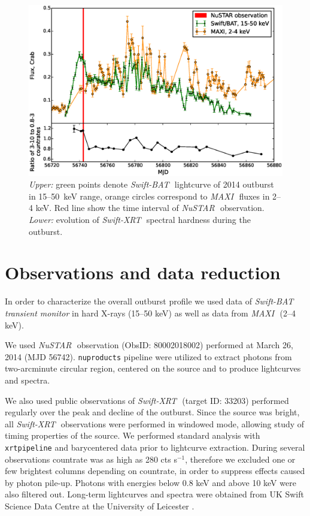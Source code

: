 \documentclass[a4paper,fleqn,usenatbib]{mnras}
\def\swiftx{{\em Swift-XRT\,}}
\def\swiftb{{\em Swift-BAT\,}}
\def\nustar{{\em NuSTAR\,}}
\def\maxi{{\em MAXI\,}}
\begin{document}
\begin{figure}
\centerline{\includegraphics[scale=0.5]{batlc_v06.eps}}
\caption{{\it Upper:} green points denote \swiftb\, lightcurve of 2014 outburst in 15--50~keV range, orange circles correspond to \maxi\, fluxes in 2--4 keV. 
Red line show the time interval of \nustar\, observation. 
{\it Lower:} evolution of \swiftx\, spectral hardness during the outburst.} 
\label{fig:batlc}
\end{figure} 

\section{Observations and data reduction}
\label{sec:datared} 
In order to characterize the overall outburst profile we used data of \swiftb\, {\it transient monitor} \citep{krimm13bat} in hard X-rays (15--50 keV) as well as data from \maxi\, \citep{matsuoka13maxi} (2--4 keV).

We used \nustar\, observation (ObsID: 80002018002) performed at March 26, 2014 (MJD 56742). 
{\texttt{nuproducts}} pipeline were utilized to extract photons from two-arcminute circular region, centered on the source and to produce lightcurves and spectra.

We also used public observations of \swiftx\, (target ID: 33203) performed regularly over the peak and decline of the outburst.  
Since the source was bright, all \swiftx\, observations were performed in windowed mode, allowing study of timing properties of the source. 
We performed standard analysis with {\texttt{xrtpipeline}} and barycentered data prior to lightcurve extraction. 
During several observations countrate was as high as 280 cts s$^{-1}$, therefore we excluded one or few brightest columns depending on countrate, in order to suppress effects caused by photon pile-up. 
Photons with energies below 0.8 keV and above 10 keV were also filtered out. 
Long-term lightcurves and spectra were obtained from UK Swift Science Data Centre at the University of Leicester \citep{evans09}.
\end{document}
